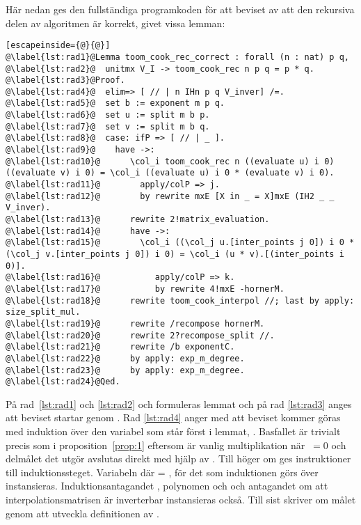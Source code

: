 Här nedan ges den fullständiga programkoden för att beviset av att den
rekursiva delen av algoritmen är korrekt, givet vissa lemman:
\lstset{numbers=left}
\begin{lstlisting}[escapeinside={@}{@}]
@\label{lst:rad1}@Lemma toom_cook_rec_correct : forall (n : nat) p q,
@\label{lst:rad2}@  unitmx V_I -> toom_cook_rec n p q = p * q.
@\label{lst:rad3}@Proof.
@\label{lst:rad4}@  elim=> [ // | n IHn p q V_inver] /=.
@\label{lst:rad5}@  set b := exponent m p q.
@\label{lst:rad6}@  set u := split m b p.
@\label{lst:rad7}@  set v := split m b q.
@\label{lst:rad8}@  case: ifP => [ // | _ ].
@\label{lst:rad9}@    have ->:
@\label{lst:rad10}@      \col_i toom_cook_rec n ((evaluate u) i 0) ((evaluate v) i 0) = \col_i ((evaluate u) i 0 * (evaluate v) i 0).
@\label{lst:rad11}@        apply/colP => j.
@\label{lst:rad12}@        by rewrite mxE [X in _ = X]mxE (IH2 _ _ V_inver).
@\label{lst:rad13}@      rewrite 2!matrix_evaluation.
@\label{lst:rad14}@      have ->:
@\label{lst:rad15}@        \col_i ((\col_j u.[inter_points j 0]) i 0 * (\col_j v.[inter_points j 0]) i 0) = \col_i (u * v).[(inter_points i 0)].
@\label{lst:rad16}@           apply/colP => k.
@\label{lst:rad17}@           by rewrite 4!mxE -hornerM.
@\label{lst:rad18}@      rewrite toom_cook_interpol //; last by apply: size_split_mul.
@\label{lst:rad19}@      rewrite /recompose hornerM.
@\label{lst:rad20}@      rewrite 2?recompose_split //.
@\label{lst:rad21}@      rewrite /b exponentC.
@\label{lst:rad22}@      by apply: exp_m_degree.
@\label{lst:rad23}@      by apply: exp_m_degree.
@\label{lst:rad24}@Qed.
\end{lstlisting}
\lstset{numbers=none}
På rad~\ref{lst:rad1} och \ref{lst:rad2} och formuleras lemmat och på rad
\ref{lst:rad3} anges att beviset startar genom . Rad \ref{lst:rad4}
anger med  att beviset kommer göras med induktion över den variabel
som står först i lemmat, . Basfallet är trivialt precis som i
proposition~\ref{prop:1} eftersom  är vanlig multiplikation när
$\ =0$ och delmålet det utgör avslutas direkt med hjälp av \C{//}. Till
höger om \C{|} ges instruktioner till induktionssteget. Variabeln  där
  = , för det  som induktionen görs över instansieras.
Induktionsantagandet , polynomen  och  och antagandet
 om att interpolationsmatrisen är inverterbar instansieras också.
Till sist skriver \C{/=} om målet genom att utveckla definitionen av
.


